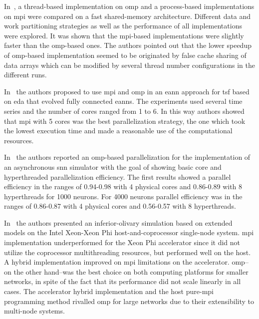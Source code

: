 {In~\cite{Strey2003ACO}, a thread-based implementation on \gls{omp} and a process-based implementations on \gls{mpi} were compared on a fast shared-memory architecture. Different data and work partitioning strategies as well as the performance of all implementations were explored. It was shown that the \gls{mpi}-based implementations were slightly faster than the \gls{omp}-based ones. The authors pointed out that the lower speedup of \gls{omp}-based implementation seemed to be originated by false cache sharing of data arrays which can be modified by several thread number configurations in the different runs.

In~\cite{6232827} the authors proposed to use \gls{mpi} and \gls{omp} in an \gls{eann} approach for \gls{tsf} based on \gls{eda} that evolved fully connected \glspl{eann}. The experiments used several time series and the number of cores ranged from 1 to 6. In this way authors showed that \gls{mpi} with 5 cores was the best parallelization strategy, the one which took the lowest execution time and made a reasonable use of the computational resources.

In~\cite{6511739} the authors reported an \gls{omp}-based parallelization for the implementation of an asynchronous \gls{snn} simulator with the goal of showing basic core and hyperthreaded parallelization efficiency. The first results showed a parallel efficiency in the ranges of 0.94-0.98 with 4 physical cores and 0.86-0.89 with 8 hyperthreads for 1000 neurons. For 4000 neurons parallel efficiency was in the ranges of 0.86-0.87 with 4 physical cores and 0.56-0.57 with 8 hyperthreads.

In~\cite{Chatzikonstantis:2016:FID:2903150.2903477} the authors presented an inferior-olivary simulation based on extended  models on the Intel Xeon-Xeon Phi host-and-coprocessor single-node system. \gls{mpi} implementation underperformed for the Xeon Phi accelerator since it did not utilize the coprocessor multithreading resources, but performed well on the host. A hybrid implementation improved on \gls{mpi} limitations on the accelerator. \gls{omp}--on the other hand--was the best choice on both computing platforms for smaller networks, in spite of the fact that its performance did not scale linearly in all cases. The accelerator hybrid implementation and the host pure-\gls{mpi} programming method rivalled \gls{omp} for large networks due to their extensibility to multi-node systems.
}



















